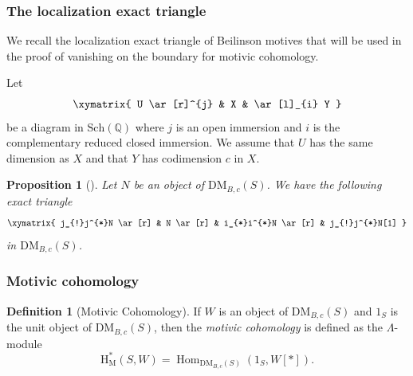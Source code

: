 \documentclass[11pt, a4paper]{amsart}
\theoremstyle{plain}
\newtheorem{proposition}[theorem]{Proposition}
\theoremstyle{definition}
\newtheorem{definition}[theorem]{Definition}
\numberwithin{equation}{section}
\def\QQ{\mathbb{Q}}
\DeclareMathOperator{\Hom}{Hom}
\begin{document}
\subsubsection{The localization exact triangle} We recall the localization exact triangle of Beilinson motives that will be used in the proof of vanishing on the boundary for motivic cohomology. 

\par Let 
\begin{equation*}
    \xymatrix{
        U \ar[r]^{j} & X & \ar[l]_{i} Y 
    }
\end{equation*}
be a diagram in $\mathrm{Sch}(\QQ)$ where $j$ is an open immersion and $i$ is the complementary reduced closed immersion. We assume that $U$ has the same dimension as $X$ and that $Y$ has codimension $c$ in $X$. 

\begin{proposition}[{\cite[Proposition 2.3.3]{Cisinski_Deglise}}]
\label{Prop: motivic localization}
    Let $N$ be an object of $\mathrm{DM}_{B,c}(S)$. We have the following exact triangle
    \begin{equation*}
        \xymatrix{
            j_{!}j^{*}N \ar[r] & N \ar[r] & i_{*}i^{*}N \ar[r] & j_{!}j^{*}N[1]
        }
    \end{equation*}
    in $\mathrm{DM}_{B,c}(S)$. 
\end{proposition}

\subsubsection{Motivic cohomology}
 
 \begin{definition}[Motivic Cohomology] \label{Def: motivic cohomology}
 If $W$ is an object of $\mathrm{DM}_{B,c}(S)$ and ${1}_{S}$ is the unit object of $\mathrm{DM}_{B,c}(S)$, then the \textit{motivic cohomology} is defined as the $\Lambda$-module
 \[
        \mathrm{H}_{\mathrm{M}}^{*}(S,W) = \Hom_{\mathrm{DM}_{B,c}(S)}(1_{S},W[*]).
 \]
 \end{definition}
\end{document}
